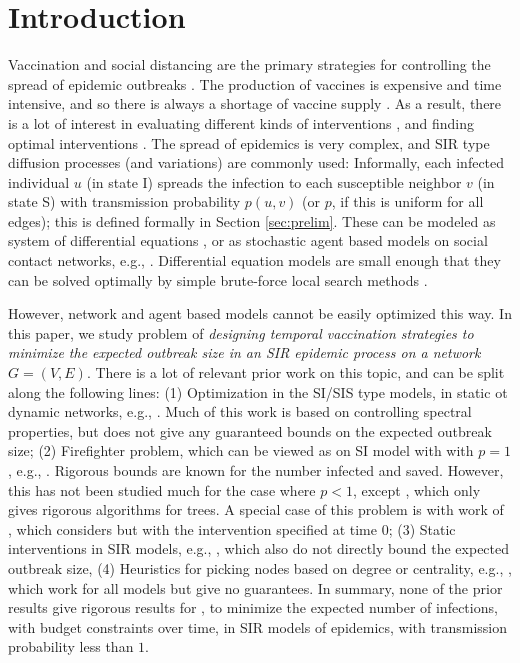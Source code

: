 \section{Introduction}
\label{sec:intro}

Vaccination and social distancing are the primary strategies for controlling the spread of epidemic outbreaks
\cite{medlock:science09,Ogura2017,halloran:pnas08,lofgren:pnas14,zhang2015controlling,YaoSDM2014,AAAI1816714,PreciadoVM13_2,PreciadoVM13,PreciadoVM14,Aspnes:2005}.
The production of vaccines is expensive and time intensive, and so there is always a shortage of
vaccine supply \cite{cdc:temporal}. As a result, there is a lot of interest in evaluating different kinds of
interventions \cite{halloran:pnas08,lofgren:pnas14}, and finding optimal interventions \cite{medlock:science09}.
The spread of epidemics is very complex, and SIR type diffusion processes (and variations) are commonly used:
Informally, each infected individual $u$ (in state I) spreads the infection to each susceptible neighbor $v$ 
(in state S) with transmission probability $p(u, v)$ (or $p$, if this is uniform for all edges); 
this is defined formally in Section \ref{sec:prelim}.
These can be modeled as system of differential equations \cite{medlock:science09,AAAI1816714,venkataramanan:ichi17}, or as stochastic
agent based models on social contact networks, e.g., \cite{marathe:cacm13}.
Differential equation models are small enough that they can be solved optimally by simple brute-force
local search methods \cite{medlock:science09}.

However, network and agent based models cannot be easily optimized this way. 
In this paper, we study problem \prob{} of \emph{designing temporal vaccination strategies to minimize
the expected outbreak size in an SIR epidemic process on a network $G=(V, E)$}.
There is a lot of relevant prior work on this topic, and can be split along the following lines:
(1) Optimization in the SI/SIS type models, in static ot dynamic networks, e.g.,
\cite{PreciadoVM13_2,PreciadoVM13,PreciadoVM14,SahaSDM15,Ogura2017}. Much of this work is based on
controlling spectral properties, but does not give any guaranteed bounds on the expected outbreak size;
(2) Firefighter problem, which can be viewed as \prob{} on SI model with with $p=1$, e.g.,
\cite{anshelevich09,Finbow2009TheFP}. Rigorous bounds are known for the number infected and saved.
However, this has not been studied much for the case where $p<1$, except \cite{DBLP:journals/corr/abs-1711-08237},
which only gives rigorous algorithms for trees.
A special case of this problem is with work of \cite{Aspnes:2005}, which considers \prob{} but with
the intervention specified at time 0;
(3) Static interventions in SIR models, e.g., \cite{zhang2015controlling,YaoSDM2014}, which also do not
directly bound the expected outbreak size,
(4) Heuristics for picking nodes based on degree or centrality, e.g., \cite{PhysRevLett.91.247901,Miller2007EffectiveVS},
which work for all models but give no guarantees.
In summary, none of the prior results give rigorous results for \prob{}, to minimize the expected
number of infections, with budget constraints over time, in SIR models of epidemics, with transmission probability less than $1$.

